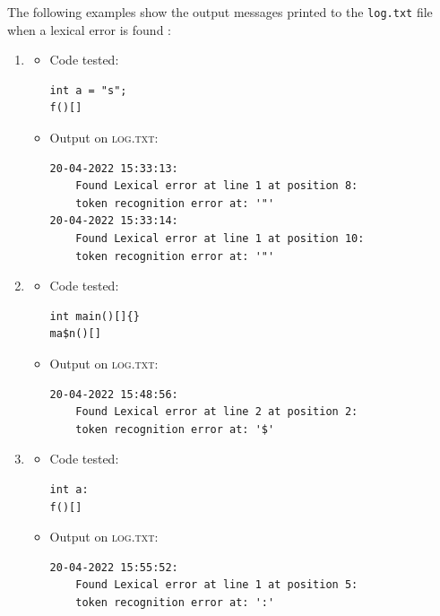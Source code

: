 \documentclass[11pt]{article} %
\begin{document}
The following examples show the output messages printed to the \verb|log.txt| file when a lexical error is found :
\begin{enumerate}
\item
	\begin{itemize}
		\item Code tested: \begin{lstlisting}
int a = "s";   
f()[]
		\end{lstlisting}
		\item Output on \textsc{log.txt}: \begin{lstlisting}
20-04-2022 15:33:13: 
    Found Lexical error at line 1 at position 8: 
    token recognition error at: '"'
20-04-2022 15:33:14: 
    Found Lexical error at line 1 at position 10: 
    token recognition error at: '"'
		\end{lstlisting}
	\end{itemize}
\item
\begin{itemize}
\item Code tested: \begin{lstlisting}
int main()[]{}
ma$n()[]
\end{lstlisting}
\item Output on \textsc{log.txt}: \begin{lstlisting}
20-04-2022 15:48:56: 
    Found Lexical error at line 2 at position 2: 
    token recognition error at: '$'
\end{lstlisting}
\end{itemize}
\item
	\begin{itemize}
	\item Code tested: \begin{lstlisting}
int a:
f()[]
	\end{lstlisting}
	\item Output on \textsc{log.txt}: \begin{lstlisting}
20-04-2022 15:55:52: 
    Found Lexical error at line 1 at position 5: 
    token recognition error at: ':'
	\end{lstlisting}
	\end{itemize}
\end{enumerate}
\end{document}
